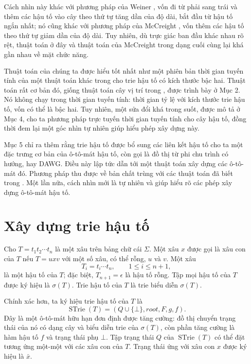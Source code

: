 \documentclass[11pt]{article}
\newcommand{\eps}{\epsilon}
\newcommand{\STrie}{\operatorname{STrie}}
\begin{document}
Cách nhìn này khác với phương pháp của Weiner \cite{weiner}, vốn đi từ phải
sang trái và thêm các hậu tố vào cây theo thứ tự tăng dần của độ dài, bắt đầu
từ hậu tố ngắn nhất; nó cũng khác với phương pháp của McCreight
\cite{mccreight}, vốn thêm các hậu tố theo thứ tự giảm dần của độ dài. Tuy
nhiên, dù trực giác ban đầu khác nhau rõ rệt, thuật toán ở đây và thuật toán
của McCreight trong dạng cuối cùng lại khá gần nhau về mặt chức năng.

Thuật toán của chúng ta được hiểu tốt nhất như một phiên bản thời gian tuyến
tính của một thuật toán khác trong \cite{ukkonen-wood} cho trie hậu tố có kích
thước bậc hai. Thuật toán rất cơ bản đó, giống thuật toán cây vị trí trong
\cite{kempf}, được trình bày ở Mục 2. Nó không chạy trong thời gian tuyến tính:
thời gian tỷ lệ với kích thước trie hậu tố, vốn có thể là bậc hai. Tuy nhiên,
một sửa đổi khá trong suốt, được mô tả ở Mục 4, cho ta phương pháp trực tuyến
thời gian tuyến tính cho cây hậu tố, đồng thời đem lại một góc nhìn tự nhiên
giúp hiểu phép xây dựng này.

Mục 5 chỉ ra thêm rằng trie hậu tố được bổ sung các liên kết hậu tố cho ta một
đặc trưng cơ bản của ô-tô-mát hậu tố, còn gọi là đồ thị từ phi chu trình có
hướng, hay DAWG. Điều này lập tức dẫn tới một thuật toán xây dựng các ô-tô-mát
đó. Phương pháp thu được về bản chất trùng với các thuật toán đã biết trong
\cite{blumer,crochemore-transducers,crochemore-constraints}. Một lần nữa,
cách nhìn mới là tự nhiên và giúp hiểu rõ các phép xây dựng ô-tô-mát hậu tố.

\section{Xây dựng trie hậu tố}

Cho $T=t_1t_2\cdots t_n$ là một xâu trên bảng chữ cái $\Sigma$. Một xâu $x$
được gọi là xâu con của $T$ nếu $T=uxv$ với một số xâu, có thể rỗng, $u$ và
$v$. Một xâu
\[
  T_i=t_i\cdots t_n,\qquad 1\le i\le n+1,
\]
là một hậu tố của $T$; đặc biệt, $T_{n+1}=\eps$ là hậu tố rỗng. Tập mọi hậu
tố của $T$ được ký hiệu là $\sigma(T)$. Trie hậu tố của $T$ là trie biểu diễn
$\sigma(T)$.

Chính xác hơn, ta ký hiệu trie hậu tố của $T$ là
\[
  \STrie(T)=(Q\cup\{\bot\},\mathit{root},F,g,f).
\]
Đây là một ô-tô-mát hữu hạn đơn định được tăng cường: đồ thị chuyển trạng thái
của nó có dạng cây và biểu diễn trie của $\sigma(T)$, còn phần tăng cường là
hàm hậu tố $f$ và trạng thái phụ $\bot$. Tập trạng thái $Q$ của $\STrie(T)$ có
thể đặt tương ứng một-một với các xâu con của $T$. Trạng thái ứng với xâu con
$x$ được ký hiệu là $\bar{x}$.
\end{document}
